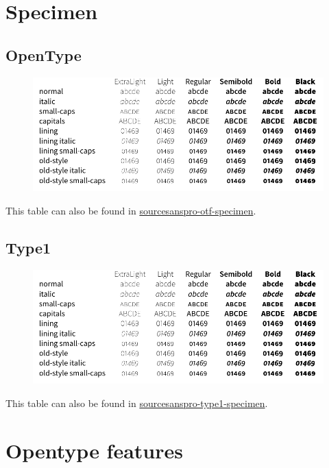 \documentclass[11pt,a4paper,english]{article}
\newcommand*\file[1]{\href{run:#1.pdf}{#1}}
\begin{document}
\section{Specimen}
\label{sec:specimen}
\subsection{OpenType}
\begin{figure}[ht]
	\centering
	\includegraphics{sourcesanspro-otf-specimen}
\end{figure}
This table can also be found in \file{sourcesanspro-otf-specimen}.

\subsection{Type1}
\begin{figure}[ht]
	\centering
	\includegraphics{sourcesanspro-type1-specimen}
\end{figure}
This table can also be found in \file{sourcesanspro-type1-specimen}.

\newpage
\section{Opentype features}
\label{sec:otfinfo}
\end{document}
